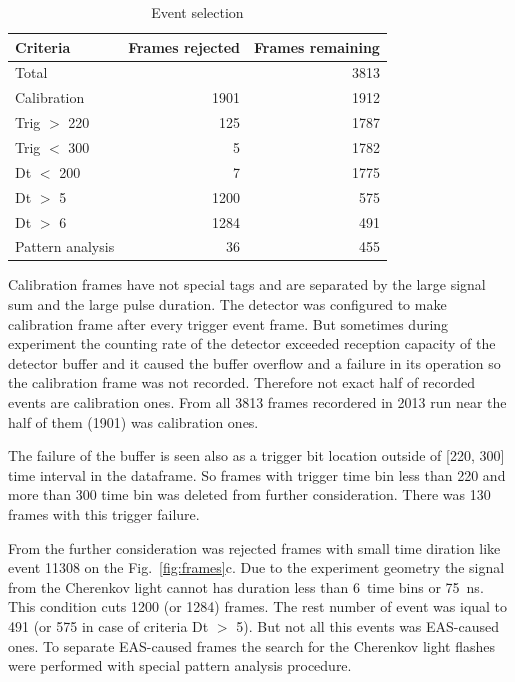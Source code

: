 \documentclass[final,5p,times,twocolumn]{elsarticle}
\begin{document}
\begin{table}[bth]
    \centering
    \caption{Event selection}
    \label{tab:rejection}
    \vspace{1pc}
    \begin{tabular}{|l||r|r|}
    \hline
    Criteria & Frames rejected & Frames remaining\\ 
    \hline \hline
    Total         &      & 3813\\
    \hline
    Calibration   & 1901 & 1912\\
    Trig $>$ 220  &  125 & 1787\\
    Trig $<$ 300  &    5 & 1782\\
    Dt   $<$ 200  &    7 & 1775\\
    Dt   $>$  5   & 1200 &  575\\
    Dt   $>$  6   & 1284 &  491\\
    Pattern analysis& 36 &  455\\
    \hline
    \end{tabular}
\end{table}

Calibration frames have not special tags and are separated by the large signal sum and the large pulse duration. The detector was configured to make calibration frame after every trigger event frame. But sometimes during experiment the counting rate of the detector exceeded reception capacity of the detector buffer and it caused the buffer overflow and a failure in its operation so the calibration frame was not recorded. Therefore not exact half of recorded events are calibration ones.
From all 3813 frames recordered in 2013 run near the half of them (1901) was calibration ones. 

The failure of the buffer is seen also as a trigger bit location outside of [220, 300] time interval in the dataframe. So frames with trigger time bin less than 220 and more than 300 time bin was deleted from further consideration. There was 130 frames with this trigger failure.

From the further consideration was rejected frames with small time diration like event 11308 on the Fig.~\ref{fig:frames}c. Due to the experiment geometry the signal from the Cherenkov light cannot has duration less than 6~time bins or 75~ns. This condition cuts 1200 (or 1284) frames. 
The rest number of event was iqual to 491 (or 575 in case of criteria Dt $>$ 5). But not all this events was EAS-caused ones. To separate EAS-caused frames the search for the Cherenkov light flashes were performed with special pattern analysis procedure. %
\end{document}
